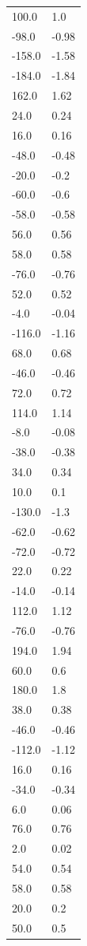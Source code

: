 \begin{longtable}{ll}
100.0 & 1.0 \\
-98.0 & -0.98 \\
-158.0 & -1.58 \\
-184.0 & -1.84 \\
162.0 & 1.62 \\
24.0 & 0.24 \\
16.0 & 0.16 \\
-48.0 & -0.48 \\
-20.0 & -0.2 \\
-60.0 & -0.6 \\
-58.0 & -0.58 \\
56.0 & 0.56 \\
58.0 & 0.58 \\
-76.0 & -0.76 \\
52.0 & 0.52 \\
-4.0 & -0.04 \\
-116.0 & -1.16 \\
68.0 & 0.68 \\
-46.0 & -0.46 \\
72.0 & 0.72 \\
114.0 & 1.14 \\
-8.0 & -0.08 \\
-38.0 & -0.38 \\
34.0 & 0.34 \\
10.0 & 0.1 \\
-130.0 & -1.3 \\
-62.0 & -0.62 \\
-72.0 & -0.72 \\
22.0 & 0.22 \\
-14.0 & -0.14 \\
112.0 & 1.12 \\
-76.0 & -0.76 \\
194.0 & 1.94 \\
60.0 & 0.6 \\
180.0 & 1.8 \\
38.0 & 0.38 \\
-46.0 & -0.46 \\
-112.0 & -1.12 \\
16.0 & 0.16 \\
-34.0 & -0.34 \\
6.0 & 0.06 \\
76.0 & 0.76 \\
2.0 & 0.02 \\
54.0 & 0.54 \\
58.0 & 0.58 \\
20.0 & 0.2 \\
50.0 & 0.5 \\

\end{longtable}
